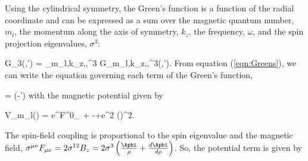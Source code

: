 Using the cylindrical symmetry, the Green's function is a function of the radial 
coordinate and can be expressed as a sum over the magnetic quantum number, $m_l$, 
the momentum along the axis of symmetry, $k_z$, the frequency, $\omega$, and 
the spin projection eigenvalues, $\sigma^3$:

\be
	G_3(,') = \sum_{m_l,k_z,\omega,\sigma^3} G_{m_l,k_z,\omega,\sigma^3}(\rho,\rho').
\ee
From equation (\ref{eqn:Greens}), we can write the equation governing each term of the 
Green's function,

\be 
\label{eqn:cylGreen}
\cylGreen 
	= \delta(\rho-\rho')
\ee 
with the magnetic potential given by

\be 
V_{m_l}(\rho) = e\sigma^{\mu \nu}F^0_{\mu \nu} + 
	-\Aphi +e^2 (\Aphi)^2.
\ee 

The spin-field coupling is proportional to the spin eigenvalue and the magnetic field,
$\sigma^{\mu \nu}F_{\mu\nu} = 2 \sigma^{1 2}B_z = 
	2 \sigma ^3\left(\frac{\Aphi}{\rho} +\frac{d\Aphi}{d\rho}\right)$.  So, the 
potential term is given by


% 
% 
% 
% 
% 
% 

